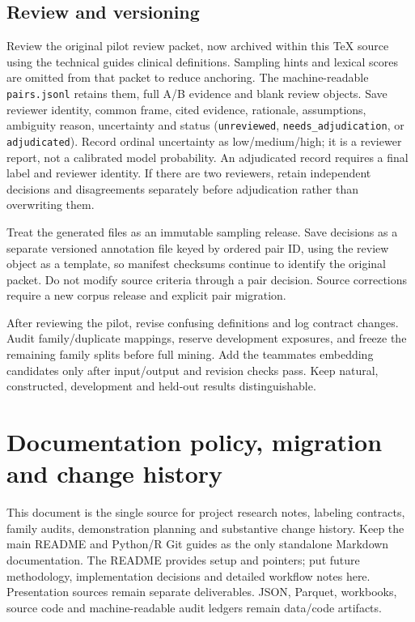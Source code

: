\documentclass[10pt,letterpaper]{article}
\newcommand{\pathcode}[1]{\nolinkurl{#1}}
\begin{document}
\subsection{Review and versioning}\label{contract01-review-and-versioning}

Review the original pilot review packet, now archived within this TeX source using the technical guide\textquotesingle s clinical definitions. Sampling hints and lexical scores are omitted from that packet to reduce anchoring. The machine-readable \pathcode{pairs.jsonl} retains them, full A/B evidence and blank review objects. Save reviewer identity, common frame, cited evidence, rationale, assumptions, ambiguity reason, uncertainty and status (\pathcode{unreviewed}, \pathcode{needs_adjudication}, or \pathcode{adjudicated}). Record ordinal uncertainty as low/medium/high; it is a reviewer report, not a calibrated model probability. An adjudicated record requires a final label and reviewer identity. If there are two reviewers, retain independent decisions and disagreements separately before adjudication rather than overwriting them.

Treat the generated files as an immutable sampling release. Save decisions as a separate versioned annotation file keyed by ordered pair ID, using the review object as a template, so manifest checksums continue to identify the original packet. Do not modify source criteria through a pair decision. Source corrections require a new corpus release and explicit pair migration.

After reviewing the pilot, revise confusing definitions and log contract changes. Audit family/duplicate mappings, reserve development exposures, and freeze the remaining family splits before full mining. Add the teammate\textquotesingle s embedding candidates only after input/output and revision checks pass. Keep natural, constructed, development and held-out results distinguishable.


\clearpage
\section{Documentation policy, migration and change history}
\label{sec:documentationpolicy}
This document is the single source for project research notes, labeling
contracts, family audits, demonstration planning and substantive change
history. Keep the main README and Python/R Git guides as the only standalone
Markdown documentation. The README provides setup and pointers; put future
methodology, implementation decisions and detailed workflow notes here.
Presentation sources remain separate deliverables. JSON, Parquet, workbooks,
source code and machine-readable audit ledgers remain data/code artifacts.
\end{document}
